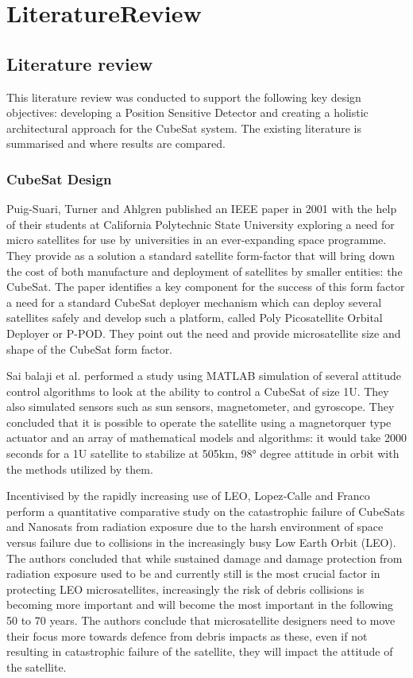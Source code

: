 \chapter{LiteratureReview}

\section{Literature review}
This literature review was conducted to support the following key design objectives: developing a Position Sensitive Detector and creating a holistic architectural approach for the CubeSat system. The existing literature is summarised and where results are compared.

\subsection{CubeSat Design}
Puig-Suari, Turner and Ahlgren published an IEEE paper in 2001 with the help of their students at California Polytechnic State University exploring a need for micro satellites for use by universities in an ever-expanding space programme. They provide as a solution a standard satellite form-factor that will bring down the cost of both manufacture and deployment of satellites by smaller entities: the CubeSat. The paper identifies a key component for the success of this form factor a need for a standard CubeSat deployer mechanism which can deploy several satellites safely and develop such a platform, called Poly Picosatellite Orbital Deployer or P-POD. They point out the need and provide microsatellite size and shape of the CubeSat form factor.

Sai balaji et al. performed a study using MATLAB simulation of several attitude control algorithms to look at the ability to control a CubeSat of size 1U. They also simulated sensors such as sun sensors, magnetometer, and gyroscope. They concluded that it is possible to operate the satellite using a magnetorquer type actuator and an array of mathematical models and algorithms: it would take 2000 seconds for a 1U satellite to stabilize at 505km, 98° degree attitude in orbit with the methods utilized by them.

Incentivised by the rapidly increasing use of LEO, Lopez‑Calle and Franco perform a quantitative comparative study on the catastrophic failure of CubeSats and Nanosats from radiation exposure due to the harsh environment of space versus failure due to collisions in the increasingly busy Low Earth Orbit (LEO). The authors concluded that while sustained damage and damage protection from radiation exposure used to be and currently still is the most crucial factor in protecting LEO microsatellites, increasingly the risk of debris collisions is becoming more important and will become the most important in the following 50 to 70 years. The authors conclude that microsatellite designers need to move their focus more towards defence from debris impacts as these, even if not resulting in catastrophic failure of the satellite, they will impact the attitude of the satellite.

